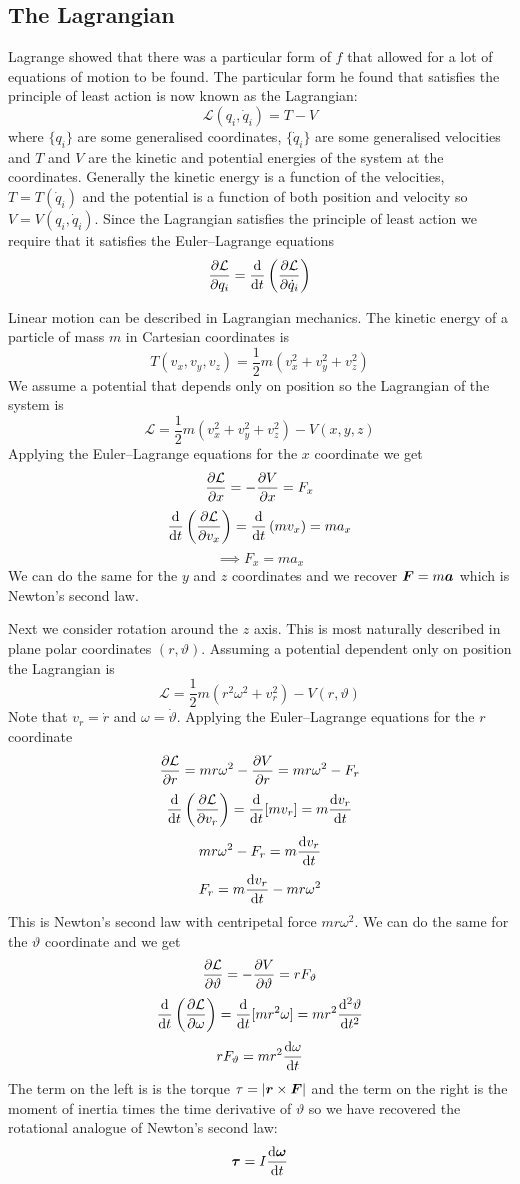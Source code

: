 \documentclass{article}
\newcommand{\LL}{\mathcal{L}}
\begin{document}
    \subsection{The Lagrangian}
    Lagrange showed that there was a particular form of \(f\) that allowed for a lot of equations of motion to be found.
    The particular form he found that satisfies the principle of least action is now known as the Lagrangian:
    \[\LL(q_i, \dot q_i) = T - V\]
    where \(\{q_i\}\) are some generalised coordinates, \(\{\dot q_i\}\) are some generalised velocities and \(T\) and \(V\) are the kinetic and potential energies of the system at the coordinates.
    Generally the kinetic energy is a function of the velocities, \(T = T(\dot q_i)\) and the potential is a function of both position and velocity so \(V = V(q_i, \dot q_i)\).
    Since the Lagrangian satisfies the principle of least action we require that it satisfies the Euler--Lagrange equations
    \[\pdv{\LL}{q_i} = \dv{t}\left(\pdv{\LL}{\dot q_i}\right)\]
    
    \example
    Linear motion can be described in Lagrangian mechanics.
    The kinetic energy of a particle of mass \(m\) in Cartesian coordinates is
    \[T(v_x, v_y, v_z) = \frac{1}{2}m(v_x^2 + v_y^2 + v_z^2)\]
    We assume a potential that depends only on position so the Lagrangian of the system is
    \[\LL = \frac{1}{2}m(v_x^2 + v_y^2 + v_z^2) - V(x, y, z)\]
    Applying the Euler--Lagrange equations for the \(x\) coordinate we get
    \[\pdv{\LL}{x} = -\pdv{V}{x} = F_x\]
    \[\dv{t}\left(\pdv{\LL}{v_x}\right) = \dv{t}\left(mv_x\right) = ma_x\]
    \[\implies F_x = ma_x\]
    We can do the same for the \(y\) and \(z\) coordinates and we recover \(\bm{F} = m\bm{a}\) which is Newton's second law.
    
    \example
    Next we consider rotation around the \(z\) axis.
    This is most naturally described in plane polar coordinates \((r, \vartheta)\).
    Assuming a potential dependent only on position the Lagrangian is
    \[\LL = \frac{1}{2}m(r^2\omega^2 + v_r^2) - V(r, \vartheta)\]
    Note that \(v_r = \dot r\) and \(\omega = \dot\vartheta\).
    Applying the Euler--Lagrange equations for the \(r\) coordinate
    \[\pdv{\LL}{r} = mr\omega^2-\pdv{V}{r} = mr\omega^2 - F_r\]
    \[\dv{t}\left(\pdv{\LL}{v_r}\right) = \dv{t}[mv_r] = m\dv{v_r}{t}\]
    \[mr\omega^2 - F_r = m\dv{v_r}{t}\]
    \[F_r = m\dv{v_r}{t} - mr\omega^2\]
    This is Newton's second law with centripetal force \(mr\omega^2\).
    We can do the same for the \(\vartheta\) coordinate and we get
    \[\pdv{\LL}{\vartheta} = -\pdv{V}{\vartheta} = rF_\vartheta\]
    \[\dv{t}\left(\pdv{\LL}{\omega}\right) = \dv{t}[mr^2\omega] = mr^2\dv[2]{\vartheta}{t}\]
    \[rF_\vartheta = mr^2\dv{\omega}{t}\]
    The term on the left is is the torque \(\tau = |\bm{r}\times\bm{F}|\) and the term on the right is the moment of inertia times the time derivative of \(\vartheta\) so we have recovered the rotational analogue of Newton's second law:
    \[\bm{\tau} = I\dv{\bm{\omega}}{t}\]
    
\end{document}
